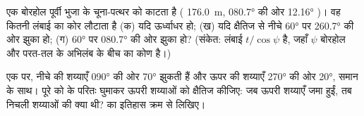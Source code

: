 \begin{exercise}[$\star\star\star$]\label{exo:b1:cross-sections:11}
एक बोरहोल पूर्वी भुजा के चूना-पत्थर को काटता है ( \qty{176.0}{m}, \ang{080.7} की ओर \ang{12.16} )।
वह कितनी लंबाई का कोर लौटाता है (क) यदि ऊर्ध्वाधर हो; (ख) यदि क्षैतिज से नीचे \ang{60} पर \ang{260.7} की ओर झुका हो;
(ग) \ang{60} पर \ang{080.7} की ओर झुका हो? (संकेत: लंबाई $t/\cos\psi$ है, जहाँ $\psi$ बोरहोल और परत-तल के अभिलंब
के बीच का कोण है।)
\end{exercise}
\begin{exercise}[$\star\star\star$]\label{exo:b1:cross-sections:12}
एक  पर, नीचे की शय्याएँ \ang{090} की ओर \ang{70} झुकती हैं और ऊपर की शय्याएँ \ang{270} की ओर \ang{20},
समान  के साथ। पूरे  को  के परितः घुमाकर ऊपरी शय्याओं को क्षैतिज कीजिए: जब ऊपरी शय्याएँ जमा
हुईं, तब निचली शय्याओं की  क्या थी?  का इतिहास क्रम से लिखिए।
\end{exercise}

